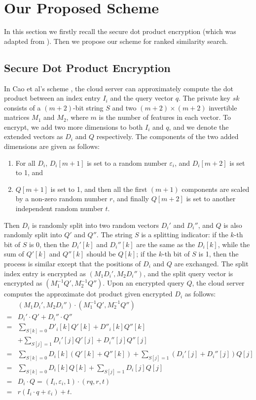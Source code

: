 \documentclass{IEEEtran}
\begin{document}
\section{Our Proposed Scheme}
In this section we firstly recall the secure dot product encryption \cite{Cao14} (which was adapted from \cite{Wong09}). Then we propose our scheme for ranked similarity search.

\subsection{Secure Dot Product Encryption}
In Cao et al's scheme \cite{Cao14}, the cloud server can approximately compute the dot product between an index entry $I_i$ and the query vector $q$. The private key $sk$ consists of a $(m+2)$-bit string $S$ and two $(m+2)\times (m+2)$ invertible matrices $M_1$ and $M_2$, where $m$ is the number of features in each vector. To encrypt, we add two more dimensions to both $I_i$ and $q$, and we denote the extended vectors as $D_i$ and $Q$ respectively. The components of the two added dimensions are given as follows: 
\begin{enumerate}
\item For all $D_i$, $D_i[m+1]$ is set to a random number $\varepsilon_i$, and $D_i[m+2]$ is set to 1, and
\item $Q[m+1]$ is set to 1, and then all the first $(m+1)$ components are scaled by a non-zero random number $r$, and finally $Q[m+2]$ is set to another independent random number $t$. 
\end{enumerate}
Then $D_i$ is randomly split into two random vectors $D_i'$ and $D_i''$, and $Q$ is also randomly split into $Q'$ and $Q''$. The string $S$ is a splitting indicator: if the $k$-th bit of $S$ is 0, then the $D_i'[k]$ and $D_i''[k]$ are the same as the $D_i[k]$, while the sum of $Q'[k]$ and $Q''[k]$ should be $Q[k]$; if the $k$-th bit of $S$ is 1, then the process is similar except that the positions of $D_i$ and $Q$ are exchanged. The split index entry is encrypted as $(M_1D_i', M_2D_i'')$, and the split query vector is encrypted as $(M_1^{-1}Q', M_2^{-1}Q'')$. Upon an encrypted query $Q$, the cloud server computes the approximate dot product given encrypted $D_i$ as follows:
\begin{equation*}
\begin{aligned}
&(M_1D_i', M_2D_i'')\cdot(M_1^{-1}Q', M_2^{-1}Q'') \\
=&D_i'\cdot Q' + D_i''\cdot Q''\\
=&\sum_{S[k]=0}D'_i[k] Q'[k] + D''_i[k] Q''[k] \\
&+ \sum_{S[j]=1} D_i'[j] Q'[j] + D_i''[j] Q''[j]\\
=&\sum_{S[k]=0}D_i[k](Q'[k] + Q''[k]) + \sum_{S[j]=1} (D_i'[j]+ D_i''[j])Q[j]\\
=&\sum_{S[k]=0}D_i[k]Q[k] + \sum_{S[j]=1} D_i[j]Q[j]\\
=&D_i \cdot Q = (I_i,\varepsilon_i,1)\cdot (rq,r,t)\\
=&r(I_i\cdot q+\varepsilon_i)+t.
\end{aligned}
\end{equation*}
\end{document}
